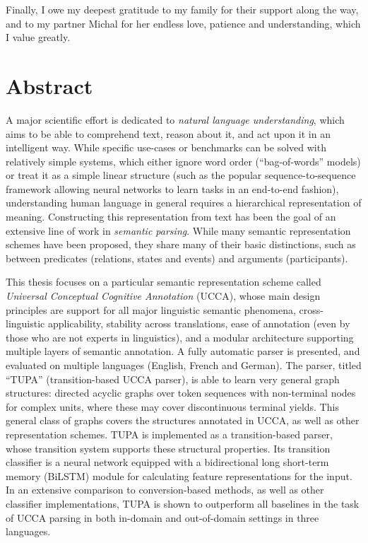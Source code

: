 \documentclass[12pt,a4paper,table]{report}
\begin{document}
Finally, I owe my deepest gratitude to my family for their support along the way,
and to my partner Michal for her endless love, patience and understanding,
which I value greatly.

\pagebreak

\section*{Abstract}

A major scientific effort is dedicated to \textit{natural language understanding},
which aims to be able to comprehend text, reason about it, and act upon it
in an intelligent way.
While specific use-cases or benchmarks can be solved with relatively simple
systems, which either ignore word order (``bag-of-words'' models) or treat
it as a simple linear structure
(such as the popular sequence-to-sequence framework allowing neural networks
to learn tasks in an end-to-end fashion),
understanding human language in general
requires a hierarchical representation of meaning.
Constructing this representation from text has been the goal of an extensive
line of work in \textit{semantic parsing}.
While many semantic representation schemes have been proposed,
they share many of their basic distinctions, such as between predicates
(relations, states and events) and arguments (participants).

This thesis focuses on a particular semantic representation scheme called
\textit{Universal Conceptual Cognitive Annotation} (UCCA),
whose main design principles are support for all major linguistic semantic phenomena,
cross-linguistic applicability, stability across translations,
ease of annotation (even by those who are not experts in linguistics),
and a modular architecture supporting multiple layers of semantic annotation.
A fully automatic parser is presented, and evaluated on multiple languages
(English, French and German).
The parser, titled ``TUPA'' (transition-based UCCA parser),
is able to learn very general graph structures:
directed acyclic graphs over token sequences with non-terminal nodes for complex
units, where these may cover discontinuous terminal yields.
This general class of graphs covers the structures annotated in UCCA,
as well as other representation schemes.
TUPA is implemented as a transition-based parser, whose transition system
supports these structural properties.
Its transition classifier is a neural network equipped with a
bidirectional long short-term memory (BiLSTM) module for calculating
feature representations for the input.
In an extensive comparison to conversion-based methods, as well as
other classifier implementations, TUPA is shown to outperform all baselines
in the task of UCCA parsing in both in-domain and out-of-domain settings
in three languages.
\end{document}
